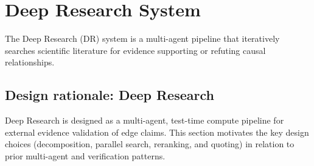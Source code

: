 \section{Deep Research System}
\label{sec:deep_research_system}

The Deep Research (DR) system is a multi-agent pipeline that iteratively searches scientific literature for evidence supporting or refuting causal relationships.

\subsection{Design rationale: Deep Research}
Deep Research is designed as a multi-agent, test-time compute pipeline for external evidence validation of edge claims. This section motivates the key design choices (decomposition, parallel search, reranking, and quoting) in relation to prior multi-agent and verification patterns.

